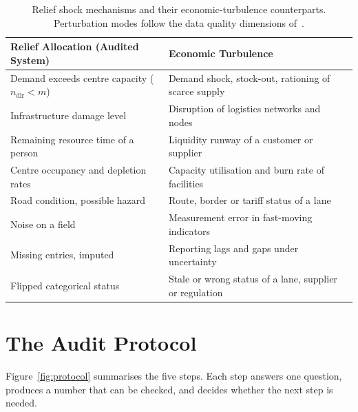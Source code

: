 \documentclass[systems,article,accept,moreauthors,pdftex]{Definitions/mdpi}
\begin{document}
\begin{table}[H]
\centering
\caption{Relief shock mechanisms and their economic-turbulence counterparts. Perturbation
modes follow the data quality dimensions of~\cite{wang1996dataquality}.\label{tab:mapping}}
\small
\begin{tabularx}{\textwidth}{>{\raggedright\arraybackslash}X>{\raggedright\arraybackslash}X}
\toprule
\textbf{Relief Allocation (Audited System)} & \textbf{Economic Turbulence}\\
\midrule
Demand exceeds centre capacity ($n_{\mathrm{dir}} < m$) & Demand shock, stock-out, rationing of \linebreak  scarce supply\\
Infrastructure damage level & Disruption of logistics networks and nodes~\cite{ivanov2020viability}\\
Remaining resource time of a person & Liquidity runway of a customer or supplier\\
Centre occupancy and depletion rates & Capacity utilisation and burn rate of facilities\\
Road condition, possible hazard & Route, border or tariff status of a lane\\
\midrule
Noise on a field & Measurement error in fast-moving indicators\\
Missing entries, imputed & Reporting lags and gaps under uncertainty~\cite{bloom2009uncertainty,baker2016epu}\\
Flipped categorical status & Stale or wrong status of a lane, supplier \linebreak  or regulation\\
\bottomrule
\end{tabularx}
\end{table}

\section{The Audit Protocol}\label{sec:protocol}

Figure~\ref{fig:protocol} summarises the five steps. Each step answers one question,
produces a number that can be checked, and decides whether the next step is needed.
\end{document}

